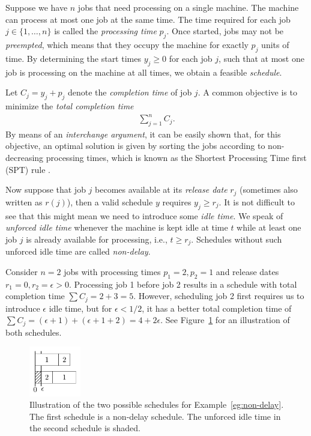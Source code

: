 \documentclass{article}
\theoremstyle{definition}
\theoremstyle{plain}
\begin{document}
Suppose we have $n$ jobs that need processing on a single machine. The machine
can process at most one job at the same time. The time required for each job
$j \in \{1, \dots, n\}$ is called the \textit{processing time} $p_{j}$. Once
started, jobs may not be \textit{preempted}, which means that they occupy the
machine for exactly $p_{j}$ units of time. By determining the start times
$y_{j} \geq 0$ for each job $j$, such that at most one job is processing on the
machine at all times, we obtain a feasible \textit{schedule}.

Let $C_{j} = y_{j} + p_{j}$ denote the \textit{completion time} of job $j$. A
common objective is to minimize the \textit{total completion time}
\begin{align*}
  \sum_{j=1}^{n} C_{j} .
\end{align*}
By means of an \textit{interchange argument}, it can be
easily shown that, for this objective, an optimal solution is given by sorting
the jobs according to non-decreasing processing times, which is known as the
Shortest Processing Time first (SPT) rule \cite{pinedoSchedulingTheoryAlgorithms2016}.

Now suppose that job $j$ becomes available at its \textit{release date} $r_{j}$
(sometimes also written as $r(j)$), then a valid schedule $y$ requires
$y_{j} \geq r_{j}$. It is not difficult to see that this might mean we need to
introduce some \textit{idle time}. We speak of \textit{unforced idle time}
whenever the machine is kept idle at time $t$ while at least one job $j$ is
already available for processing, i.e., $t \geq r_{j}$. Schedules without such
unforced idle time are called \textit{non-delay}.

\begin{eg}
  \label{eg:non-delay}
  Consider $n=2$ jobs with processing times $p_{1}=2, p_{2}=1$ and release dates
  $r_{1}=0, r_{2}=\epsilon > 0$. Processing job 1 before job 2 results in a
  schedule with total completion time $\sum C_{j} = 2 + 3 = 5$. However,
  scheduling job 2 first requires us to introduce $\epsilon$ idle time, but for
  $\epsilon < 1/2$, it has a better total completion time of
  $\sum C_{j} = (\epsilon + 1) + (\epsilon + 1 + 2) = 4 + 2 \epsilon$. See
  Figure~\ref{fig:non-delay} for an illustration of both schedules.
\end{eg}

\begin{figure}
  \centering
  \includegraphics[width=0.2\textwidth]{figures/non-delay.pdf}
  \caption{Illustration of the two possible schedules for
    Example~\ref{eg:non-delay}. The first schedule is a non-delay schedule. The
    unforced idle time in the second schedule is shaded.}
  \label{fig:non-delay}
\end{figure}
\end{document}

